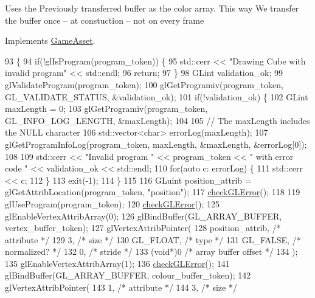 Uses the Previously transferred buffer as the color array. This way We transfer the buffer once -- at constuction -- not on every frame

Implements \hyperlink{classGameAsset_a961aa51ca0a9961fc584c0b5d5431300}{Game\+Asset}.


\begin{DoxyCode}
93                                            \{
94   \textcolor{keywordflow}{if}(!glIsProgram(program\_token)) \{
95     std::cerr << \textcolor{stringliteral}{"Drawing Cube with invalid program"} << std::endl;
96     \textcolor{keywordflow}{return};
97   \}
98   GLint validation\_ok;
99   glValidateProgram(program\_token);
100   glGetProgramiv(program\_token, GL\_VALIDATE\_STATUS, &validation\_ok);
101   \textcolor{keywordflow}{if}(!validation\_ok) \{
102     GLint maxLength = 0;
103     glGetProgramiv(program\_token, GL\_INFO\_LOG\_LENGTH, &maxLength);
104 
105     \textcolor{comment}{// The maxLength includes the NULL character}
106     std::vector<char> errorLog(maxLength);
107     glGetProgramInfoLog(program\_token, maxLength, &maxLength, &errorLog[0]);
108 
109     std::cerr << \textcolor{stringliteral}{"Invalid program "} << program\_token << \textcolor{stringliteral}{" with error code "} << validation\_ok << std::endl;
110     \textcolor{keywordflow}{for}(\textcolor{keyword}{auto} c: errorLog) \{
111       std::cerr << c;
112     \}
113     exit(-1);
114   \}
115 
116   GLuint position\_attrib = glGetAttribLocation(program\_token, \textcolor{stringliteral}{"position"});
117   \hyperlink{GroundAsset_8cc_a75f201b0e53e68726854997957322b8d}{checkGLError}();
118 
119   glUseProgram(program\_token);
120   \hyperlink{GroundAsset_8cc_a75f201b0e53e68726854997957322b8d}{checkGLError}();
125   glEnableVertexAttribArray(0);
126   glBindBuffer(GL\_ARRAY\_BUFFER, vertex\_buffer\_token);
127   glVertexAttribPointer(
128     position\_attrib,        \textcolor{comment}{/* attribute */}
129     3,        \textcolor{comment}{/* size */}
130     GL\_FLOAT,   \textcolor{comment}{/* type */}
131     GL\_FALSE,   \textcolor{comment}{/* normalized? */}
132     0,        \textcolor{comment}{/* stride */}
133     (\textcolor{keywordtype}{void}*)0    \textcolor{comment}{/* array buffer offset */}
134   );
135   glEnableVertexAttribArray(1);
136   \hyperlink{GroundAsset_8cc_a75f201b0e53e68726854997957322b8d}{checkGLError}();
141   glBindBuffer(GL\_ARRAY\_BUFFER, colour\_buffer\_token);
142   glVertexAttribPointer(
143     1,        \textcolor{comment}{/* attribute */}
144     3,        \textcolor{comment}{/* size */}

\end{DoxyCode}

